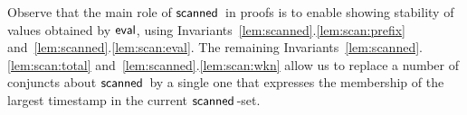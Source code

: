 
Observe that the main role of $\scanned$ in
proofs is to enable showing stability of values obtained by $\mathsf{eval}$,
using Invariants~\ref{lem:scanned}.\ref{lem:scan:prefix}
and~\ref{lem:scanned}.\ref{lem:scan:eval}. The remaining
Invariants~\ref{lem:scanned}.\ref{lem:scan:total}
and~\ref{lem:scanned}.\ref{lem:scan:wkn} allow us to replace a number
of conjuncts about $\scanned$ by a single one that expresses the membership
of the largest timestamp in the current $\scanned$-set.

\begin{comment}

\begin{figure}
\[
\begin{array}{r l}
  \num{1} & \specK{\{\ \histS = \hempty \}} \\
  \num{2} & \specK{\{\ \histS = \hempty \wedge
    w = \stableorder \wedge h = \hist \}} \\
  \num{3} & r_1 \tbnd \esc{scan};\\
   \num{4} & \specK{\{ \exists\, t_1\ldot\,
       \histS = \hempty \wedge h \subseteq \hist \wedge
       w \subseteq \stableorder \wedge
      \dom{h} \subseteq \ideal{\stableorder}{t_1} \wedge}\\
          & \specK{\hphantom{\{ \exists\, t_1\ldot}\,
        t_1 \in \scanned{\stableorder}  \wedge
        r_1 = \eval\, t_s\, \stableorder\, \hist\}}\\
   \num{5} & \specK{\{ \exists\, t_1\ldot\,
       \histS = \hempty \wedge j = \hist \wedge h \subseteq j \wedge
       s = \stableorder \wedge w \subseteq s \wedge
      \dom{h} \subseteq \ideal{s}{t} \wedge }\\
          & \specK{\hphantom{\{\ \exists\, t_1\ldot}\,
        t_1 \in \scanned s \wedge r_1 = \eval\, t_1\, s\, j\}}\\
  \num{6} & r_2 \tbnd \esc{scan};\\
  \num{7} & \specK{\{ \exists\, t_1\, t_2\ldot\,
     \histS = \hempty \wedge
     h \subseteq j \subseteq \hist \wedge
      w \subseteq s  \subseteq \stableorder \wedge
      \dom{h} \subseteq \ideal{s}{t_1} \wedge}\\
      & \specK{\hphantom{\{ \exists\, t_1\, t_2\ldot}\,
      t_1 \in \scanned s \wedge r_1 = \eval\, t_1\, s\, j \wedge
      \wedge \ideal{s}{t_1} = \ideal{\stableorder}{t_1}\wedge}\\

\end{comment}
